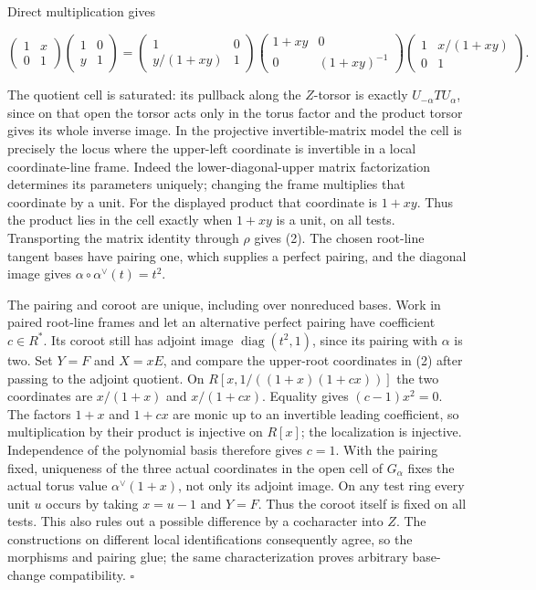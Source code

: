 \documentclass[11pt,a4paper,openany]{report}
\begin{document}
Direct multiplication gives

\[
\begin{pmatrix}1&x\\0&1\end{pmatrix}
\begin{pmatrix}1&0\\y&1\end{pmatrix}
=
\begin{pmatrix}1&0\\y/(1+xy)&1\end{pmatrix}
\begin{pmatrix}1+xy&0\\0&(1+xy)^{-1}\end{pmatrix}
\begin{pmatrix}1&x/(1+xy)\\0&1\end{pmatrix}.
\]

The quotient cell is saturated: its pullback along the \(Z\)-torsor is exactly \(U_{-\alpha}TU_\alpha\), since on that open the torsor acts only in the torus factor and the product torsor gives its whole inverse image. In the projective invertible-matrix model the cell is precisely the locus where the upper-left coordinate is invertible in a local coordinate-line frame. Indeed the lower-diagonal-upper matrix factorization determines its parameters uniquely; changing the frame multiplies that coordinate by a unit. For the displayed product that coordinate is \(1+xy\). Thus the product lies in the cell exactly when \(1+xy\) is a unit, on all tests. Transporting the matrix identity through \(\rho\) gives (2). The chosen root-line tangent bases have pairing one, which supplies a perfect pairing, and the diagonal image gives \(\alpha\circ\alpha^\vee(t)=t^2\).

The pairing and coroot are unique, including over nonreduced bases. Work in paired root-line frames and let an alternative perfect pairing have coefficient \(c\in R^*\). Its coroot still has adjoint image \(\operatorname{diag}(t^2,1)\), since its pairing with \(\alpha\) is two. Set \(Y=F\) and \(X=xE\), and compare the upper-root coordinates in (2) after passing to the adjoint quotient. On \(R[x,1/((1+x)(1+cx))]\) the two coordinates are \(x/(1+x)\) and \(x/(1+cx)\). Equality gives \((c-1)x^2=0\). The factors \(1+x\) and \(1+cx\) are monic up to an invertible leading coefficient, so multiplication by their product is injective on \(R[x]\); the localization is injective. Independence of the polynomial basis therefore gives \(c=1\). With the pairing fixed, uniqueness of the three actual coordinates in the open cell of \(G_\alpha\) fixes the actual torus value \(\alpha^\vee(1+x)\), not only its adjoint image. On any test ring every unit \(u\) occurs by taking \(x=u-1\) and \(Y=F\). Thus the coroot itself is fixed on all tests. This also rules out a possible difference by a cocharacter into \(Z\). The constructions on different local identifications consequently agree, so the morphisms and pairing glue; the same characterization proves arbitrary base-change compatibility. \(\square\)
\end{document}
